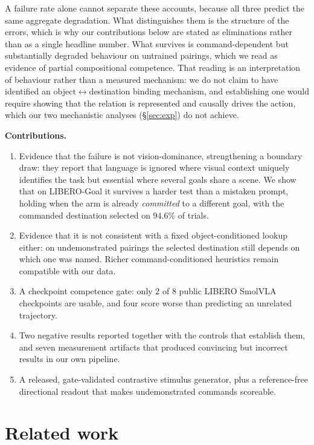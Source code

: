 \documentclass{article}
\begin{document}
A failure rate alone cannot separate these accounts, because all three predict the same
aggregate degradation. What distinguishes them is the structure of the errors, which is why our
contributions below are stated as eliminations rather than as a single headline number. What
survives is command-dependent but substantially degraded behaviour on untrained pairings, which
we read as evidence of partial compositional competence. That reading is an interpretation of
behaviour rather than a measured mechanism: we do not claim to have identified an
object$\leftrightarrow$destination binding mechanism, and establishing one would require showing
that the relation is represented and causally drives the action, which our two mechanistic
analyses (\S\ref{sec:exp}) do not achieve.

\textbf{Contributions.}
\begin{enumerate}[leftmargin=2em,itemsep=0pt,topsep=2pt]
\item Evidence that the failure is not vision-dominance, strengthening a boundary
  \citet{notallfeatures} draw: they report that language is ignored where visual context
  uniquely identifies the task but essential where several goals share a scene. We show that on
  LIBERO-Goal it survives a harder test than a mistaken prompt, holding when the arm is already
  \emph{committed} to a different goal, with the commanded destination selected on $94.6\%$ of
  trials.
\item Evidence that it is not consistent with a fixed object-conditioned lookup either: on
  undemonstrated pairings the selected destination still depends on which one was named. Richer
  command-conditioned heuristics remain compatible with our data.
\item A checkpoint competence gate: only 2 of 8 public LIBERO SmolVLA checkpoints are usable,
  and four score worse than predicting an unrelated trajectory.
\item Two negative results reported together with the controls that establish them, and seven
  measurement artifacts that produced convincing but incorrect results in our own pipeline.
\item A released, gate-validated contrastive stimulus generator, plus a reference-free
  directional readout that makes undemonstrated commands scoreable.
\end{enumerate}

\section{Related work}
\label{sec:related}
\end{document}
